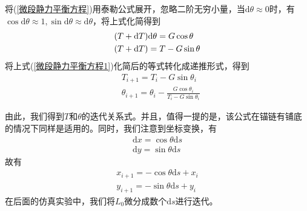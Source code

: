             将(\ref{微段静力平衡方程})用泰勒公式展开，忽略二阶无穷小量，当$\mathrm{d}\theta \approx 0$时，有$\cos \mathrm{d}\theta \approx 1,\sin \mathrm{d}\theta \approx \mathrm{d}\theta$，将上式化简得到
            \begin{align}
            \label{微段静力平衡方程1}
            & (T+\mathrm{d}T)\mathrm{d}\theta = G \cos\theta\\
            & (T+\mathrm{d}T) = T - G\sin \theta\notag
            \end{align}
            将上式(\ref{微段静力平衡方程1})化简后的等式转化成递推形式，得到
            \begin{align*}
            & T_{i+1} = T_i -G\sin \theta_i\\
            & \theta_{i+1} = \theta_i - \frac{G\cos\theta_i}{T_i - G\sin \theta_i}
            \end{align*}
            \par
            由此，我们得到$T$和$\theta$的迭代关系式。并且，值得一提的是，该公式在锚链有铺底的情况下同样是适用的。同时，我们注意到坐标变换，有
            \begin{align*}
            \mathrm{d}x = \cos \theta \mathrm{d}s\\
            \mathrm{d}y = \sin \theta \mathrm{d}s
            \end{align*}
            故有
            \begin{align*}
            x_{i+1} = -\cos\theta\mathrm{d}s+x_i\\
            y_{i+1} = -\sin\theta\mathrm{d}s+y_i
            \end{align*}
            在后面的仿真实验中，我们将$L_0$微分成数个$\mathrm{d}s$进行迭代。
